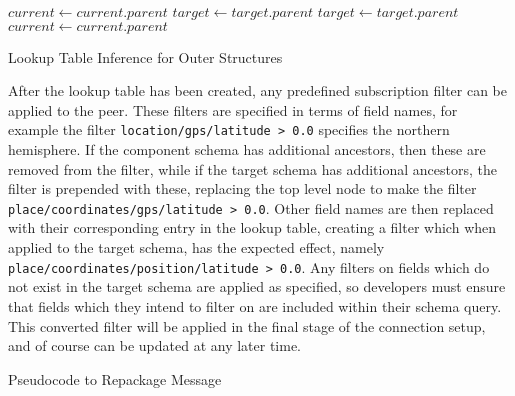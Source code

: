 \documentclass[12pt,twoside,notitlepage]{report}
\begin{document}
\begin{algorithm}
\algnewcommand{}
\begin{algorithmic}[1]
	\State {}
	\State $current\gets current.parent$
	\State $target\gets target.parent$
\EndWhile
{}
	\State {}
	\State $target\gets target.parent$
\EndWhile
{}
	\State {}
	\State $current\gets current.parent$
\EndWhile
\end{algorithmic}
\caption{Lookup Table Inference for Outer Structures}
\label{alg:construct_lookup_outer}
\end{algorithm} 

After the lookup table has been created, any predefined subscription filter can be applied to the peer. 
These filters are specified in terms of field names, for example the filter {\tt location/gps/latitude > 0.0} specifies the northern hemisphere. 
If the component schema has additional ancestors, then these are removed from the filter, while if the target schema has additional ancestors, the filter is prepended with these, replacing the top level node to make the filter {\tt place/coordinates/gps/latitude > 0.0}.
Other field names are then replaced with their corresponding entry in the lookup table, creating a filter which when applied to the target schema, has the expected effect, namely {\tt place/coordinates/position/latitude > 0.0}.
Any filters on fields which do not exist in the target schema are applied as specified, so developers must ensure that fields which they intend to filter on are included within their schema query. 
This converted filter will be applied in the final stage of the connection setup, and of course can be updated at any later time. 

\begin{algorithm}
\begin{algorithmic}[1]
		\State {}
	\EndIf
	
	\State {}
	
		\State {}
	\EndIf
\EndFunction 
\end{algorithmic}
\caption{Pseudocode to Repackage Message}
\label{alg:repack_message_overall}
\end{algorithm}
\end{document}
